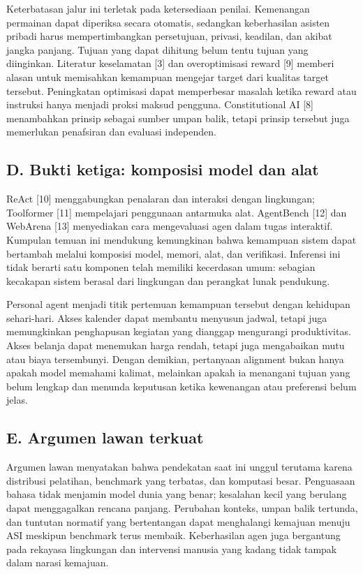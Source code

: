 \documentclass[conference,a4paper]{IEEEtran}
\begin{document}
Keterbatasan jalur ini terletak pada ketersediaan penilai. Kemenangan permainan dapat diperiksa secara otomatis, sedangkan keberhasilan asisten pribadi harus mempertimbangkan persetujuan, privasi, keadilan, dan akibat jangka panjang. Tujuan yang dapat dihitung belum tentu tujuan yang diinginkan. Literatur keselamatan [3] dan overoptimisasi reward [9] memberi alasan untuk memisahkan kemampuan mengejar target dari kualitas target tersebut. Peningkatan optimisasi dapat memperbesar masalah ketika reward atau instruksi hanya menjadi proksi maksud pengguna. Constitutional AI [8] menambahkan prinsip sebagai sumber umpan balik, tetapi prinsip tersebut juga memerlukan penafsiran dan evaluasi independen.

\subsection*{D. Bukti ketiga: komposisi model dan alat}
ReAct [10] menggabungkan penalaran dan interaksi dengan lingkungan; Toolformer [11] mempelajari penggunaan antarmuka alat. AgentBench [12] dan WebArena [13] menyediakan cara mengevaluasi agen dalam tugas interaktif. Kumpulan temuan ini mendukung kemungkinan bahwa kemampuan sistem dapat bertambah melalui komposisi model, memori, alat, dan verifikasi. Inferensi ini tidak berarti satu komponen telah memiliki kecerdasan umum: sebagian kecakapan sistem berasal dari lingkungan dan perangkat lunak pendukung.

Personal agent menjadi titik pertemuan kemampuan tersebut dengan kehidupan sehari-hari. Akses kalender dapat membantu menyusun jadwal, tetapi juga memungkinkan penghapusan kegiatan yang dianggap mengurangi produktivitas. Akses belanja dapat menemukan harga rendah, tetapi juga mengabaikan mutu atau biaya tersembunyi. Dengan demikian, pertanyaan alignment bukan hanya apakah model memahami kalimat, melainkan apakah ia menangani tujuan yang belum lengkap dan menunda keputusan ketika kewenangan atau preferensi belum jelas.

\subsection*{E. Argumen lawan terkuat}
Argumen lawan menyatakan bahwa pendekatan saat ini unggul terutama karena distribusi pelatihan, benchmark yang terbatas, dan komputasi besar. Penguasaan bahasa tidak menjamin model dunia yang benar; kesalahan kecil yang berulang dapat menggagalkan rencana panjang. Perubahan konteks, umpan balik tertunda, dan tuntutan normatif yang bertentangan dapat menghalangi kemajuan menuju ASI meskipun benchmark terus membaik. Keberhasilan agen juga bergantung pada rekayasa lingkungan dan intervensi manusia yang kadang tidak tampak dalam narasi kemajuan.
\end{document}
